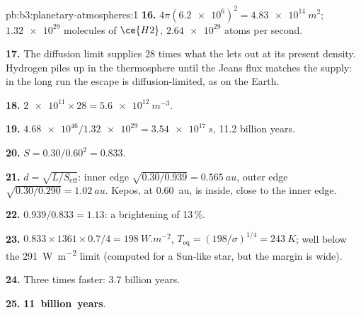 \begin{solution}{pb:b3:planetary-atmospheres:1}
\textbf{16.} $4\pi(\num{6.2e6})^2 = \qty{4.83e14}{m^2}$; $\num{1.32e29}$ molecules
of $\ce{H2}$, $\num{2.64e29}$ atoms per second.

\textbf{17.} The diffusion limit supplies 28 times what the  lets out at
its present density. Hydrogen piles up in the thermosphere until the
Jeans flux matches the supply: in the long run the escape is
diffusion-limited, as on the Earth.

\textbf{18.} $\num{2e11}\times28 = \qty{5.6e12}{m^{-3}}$.

\textbf{19.} $\num{4.68e46}/\num{1.32e29} = \qty{3.54e17}{s}$, 11.2 billion years.

\textbf{20.} $S = 0.30/0.60^2 = 0.833$.

\textbf{21.} $d = \sqrt{L/S_\mathrm{eff}}$: inner edge $\sqrt{0.30/0.939} =
\qty{0.565}{au}$, outer edge $\sqrt{0.30/0.290} = \qty{1.02}{au}$. Kepos,
at \qty{0.60}{au}, is inside, close to the inner edge.

\textbf{22.} $0.939/0.833 = 1.13$: a brightening of 13\,\%.

\textbf{23.} $0.833\times1361\times0.7/4 = \qty{198}{W.m^{-2}}$, $T_\mathrm{eq} =
(198/\sigma)^{1/4} = \qty{243}{K}$; well below the
\qty{291}{W.m^{-2}} limit (computed for a Sun-like star, but the margin
is wide).

\textbf{24.} Three times faster: 3.7 billion years.

\textbf{25.} \textbf{11~billion~years}.
\end{solution}

